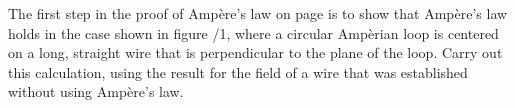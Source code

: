         The first step in the proof of Amp\`{e}re's law on page \pageref{ampereproof}
        is to show that Amp\`{e}re's law holds in the case shown in figure
        /1, where a circular Amp\`{e}rian loop is
        centered on a long, straight wire that is perpendicular to the plane
        of the loop. Carry out this calculation, using the result 
        for the field of a wire that was established without using Amp\`{e}re's law.
